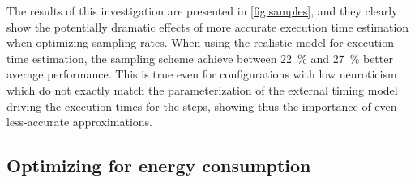 The results of this investigation are presented in \cref{fig:samples}, and they clearly show the potentially dramatic effects of more accurate execution time estimation when optimizing sampling rates.
When using the realistic model for execution time estimation, the sampling scheme achieve between \SI{22}{\percent} and \SI{27}{\percent} better average performance.
This is true even for configurations with low neuroticism which do not exactly match the parameterization of the external timing model driving the execution times for the steps, showing thus the importance of even less-accurate approximations.

\subsection{Optimizing for energy consumption}

